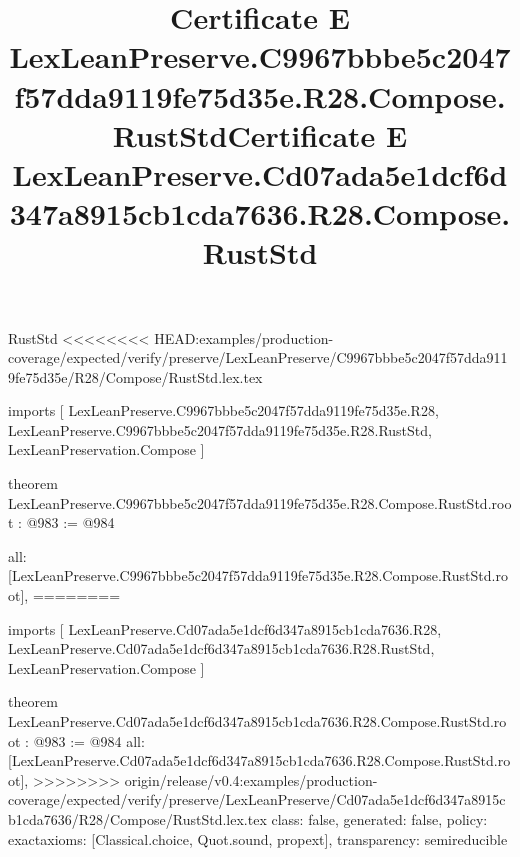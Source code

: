 \begin{lexlean}{RustStd}
<<<<<<<< HEAD:examples/production-coverage/expected/verify/preserve/LexLeanPreserve/C9967bbbe5c2047f57dda9119fe75d35e/R28/Compose/RustStd.lex.tex
\title{Certificate E LexLeanPreserve.C9967bbbe5c2047f57dda9119fe75d35e.R28.Compose.RustStd}
\begin{coremodule}
imports [
  LexLeanPreserve.C9967bbbe5c2047f57dda9119fe75d35e.R28,
  LexLeanPreserve.C9967bbbe5c2047f57dda9119fe75d35e.R28.RustStd,
  LexLeanPreservation.Compose
]

theorem LexLeanPreserve.C9967bbbe5c2047f57dda9119fe75d35e.R28.Compose.RustStd.root : @983 := @984 {
  all: [LexLeanPreserve.C9967bbbe5c2047f57dda9119fe75d35e.R28.Compose.RustStd.root],
========
\title{Certificate E LexLeanPreserve.Cd07ada5e1dcf6d347a8915cb1cda7636.R28.Compose.RustStd}
\begin{coremodule}
imports [
  LexLeanPreserve.Cd07ada5e1dcf6d347a8915cb1cda7636.R28,
  LexLeanPreserve.Cd07ada5e1dcf6d347a8915cb1cda7636.R28.RustStd,
  LexLeanPreservation.Compose
]

theorem LexLeanPreserve.Cd07ada5e1dcf6d347a8915cb1cda7636.R28.Compose.RustStd.root : @983 := @984 {
  all: [LexLeanPreserve.Cd07ada5e1dcf6d347a8915cb1cda7636.R28.Compose.RustStd.root],
>>>>>>>> origin/release/v0.4:examples/production-coverage/expected/verify/preserve/LexLeanPreserve/Cd07ada5e1dcf6d347a8915cb1cda7636/R28/Compose/RustStd.lex.tex
  class: false,
  generated: false,
  policy: exact{axioms: [Classical.choice, Quot.sound, propext]},
  transparency: semireducible
}


\end{coremodule}}
\end{coremodule}
\end{lexlean}
